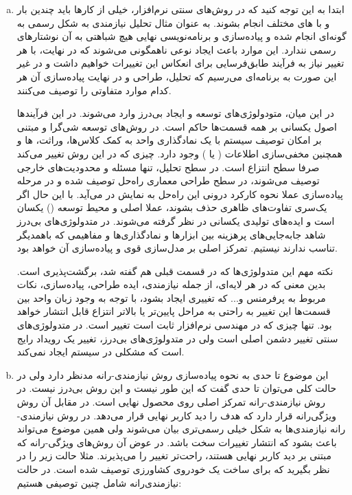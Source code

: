 {\begin{enumerate}[a)]
		\item 
		ابتدا به این توجه کنید که در روش‌های سنتی نرم‌افزار، خیلی از کارها باید چندین بار و با  های مختلف انجام بشوند. به عنوان مثال تحلیل نیازمندی به شکل رسمی به گونه‌ای انجام شده و پیاده‌سازی و برنامه‌نویسی نهایی هیچ شباهتی به آن نوشتارهای رسمی نندارد.  این موارد باعث ایجاد نوعی ناهمگونی می‌شوند که در نهایت، با هر تغییر نیاز به فرآیند طابق‌فرسایی برای انعکاس این تغییرات خواهیم داشت و در غیر این صورت به برنامه‌ای می‌رسیم که تحلیل، طراحی و در نهایت پیاده‌سازی آن هر کدام موارد متفاوتی را توصیف می‌کنند.
		
		در این میان، متودولوژی‌های توسعه و ایجاد بی‌درز وارد می‌شوند. در این فرآیند‌ها اصول یکسانی بر همه قسمت‌ها حاکم است. در روش‌های توسعه شی‌گرا و مبتنی بر امکان توصیف سیستم با یک نمادگذاری واحد به کمک کلاس‌ها، وراثت،  ها و همچنین مخفی‌سازی اطلاعات ( یا ) وجود دارد. چیزی که در این روش تغییر می‌کند صرفا سطح انتزاع است. در سطح تحلیل، تنها مسئله و محدودیت‌های خارجی توصیف می‌شوند، در سطح طراحی معماری راه‌حل توصیف شده و در مرحله پیاده‌سازی عملا نحوه کارکرد درونی این راه‌حل به نمایش در می‌آید. با این حال اگر یک‌سری تفاوت‌های ظاهری حذف بشوند، عملا  اصلی و محیط توسعه () یکسان است و ایده‌های تولیدی یکسانی در نظر گرفته می‌شوند. در متدولوژی‌های بی‌درز شاهد جابه‌جایی‌های پرهزینه بین ابزارها و نمادگذاری‌ها و مفاهیمی که باهمدیگر تناسب ندارند نیستیم. تمرکز اصلی بر مدل‌سازی قوی و پیاده‌سازی آن خواهد بود.
		
		نکته مهم این متدولوژی‌ها که در قسمت‌ قبلی هم گفته شد، برگشت‌پذیری است. بدین معنی که در هر لایه‌ای، از جمله نیازمندی، ایده طراحی، پیاده‌سازی، نکات مربوط به پرفرمنس و... که تغییری ایجاد بشود، با توجه به وجود زبان واحد بین قسمت‌ها این تغییر به راحتی به مراحل پایین‌تر یا بالاتر انتزاع قابل انتشار خواهد بود. تنها چیزی که در مهندسی نرم‌افزار ثابت است تغییر است. در متدولوژی‌های سنتی تغییر دشمن اصلی است ولی در متدولوژی‌های بی‌درز، تغییر یک رویداد رایج است که مشکلی در سیستم ایجاد نمی‌کند.
		
		
	
		\item
این موضوع تا حدی به نحوه پیاده‌سازی روش نیازمندی-رانه مدنظر دارد ولی در حالت کلی می‌توان تا حدی گفت که این طور نیست و این روش بی‌درز نیست. در روش نیازمندی-رانه تمرکز اصلی روی محصول نهایی است. در مقابل آن روش ویژگی‌رانه قرار دارد که هدف را دید کاربر نهایی قرار می‌دهد. در روش نیازمندی-رانه نیازمندی‌ها به شکل خیلی رسمی‌تری بیان می‌شوند ولی همین موضوع می‌تواند باعث بشود که انتشار تغییرات سخت باشد. در عوض آن روش‌های ویژگی-رانه که مبتنی بر دید کاربر نهایی هستند، راحت‌تر تغییر را می‌پذیرند. مثلا حالت زیر را در نظر بگیرید که برای ساخت یک خودروی کشاورزی توصیف شده است. در حالت نیازمندی‌رانه شامل چنین توصیفی هستیم:


\end{enumerate}}
